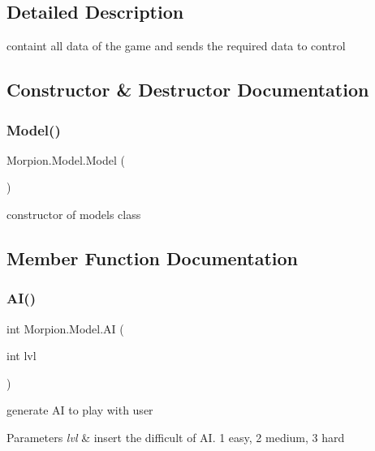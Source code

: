 \subsection{Detailed Description}
containt all data of the game and sends the required data to control 



\subsection{Constructor \& Destructor Documentation}
\mbox{\label{class_morpion_1_1_model_a459b4901421170316a320d2e7d6408b4}} 
\subsubsection{\texorpdfstring{Model()}{Model()}}
{\footnotesize\ttfamily Morpion.\+Model.\+Model (\begin{DoxyParamCaption}{ }\end{DoxyParamCaption})}



constructor of model\textquotesingle{}s class 



\subsection{Member Function Documentation}
\mbox{\label{class_morpion_1_1_model_a02dd1ba77ebd6563c86164592b339ed0}} 
\subsubsection{\texorpdfstring{A\+I()}{AI()}}
{\footnotesize\ttfamily int Morpion.\+Model.\+AI (\begin{DoxyParamCaption}\item[{int}]{lvl }\end{DoxyParamCaption})}



generate AI to play with user 


\begin{DoxyParams}{Parameters}
{\em lvl} & insert the difficult of AI. 1 easy, 2 medium, 3 hard\\
\hline
\end{DoxyParams}
\mbox{\label{class_morpion_1_1_model_a76f2eb1ec20a4aa78cca17514a0b94e1}} 
